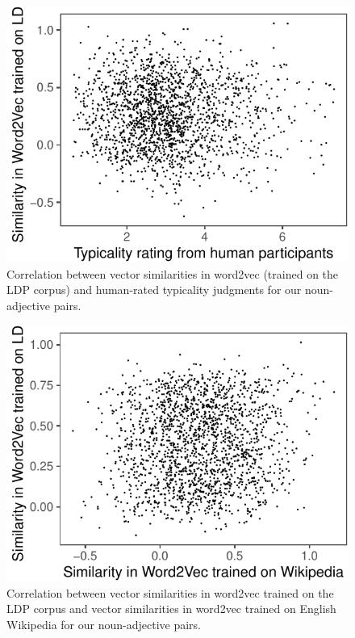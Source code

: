 \documentclass[10pt, letterpaper]{article}
\newenvironment{CodeChunk}{}{}
\begin{document}
\begin{CodeChunk}
\begin{figure}[tb]

{\centering \includegraphics{figs/word2vec1-1} 

}

\caption[Correlation between vector similarities in word2vec (trained on the LDP corpus) and human-rated typicality judgments for our noun-adjective pairs]{Correlation between vector similarities in word2vec (trained on the LDP corpus) and human-rated typicality judgments for our noun-adjective pairs.}\label{fig:word2vec1}
\end{figure}
\end{CodeChunk}
\begin{CodeChunk}
\begin{figure}[tb]

{\centering \includegraphics{figs/word2vec2-1} 

}

\caption[Correlation between vector similarities in word2vec trained on the LDP corpus and vector similarities in word2vec trained on English Wikipedia for our noun-adjective pairs]{Correlation between vector similarities in word2vec trained on the LDP corpus and vector similarities in word2vec trained on English Wikipedia for our noun-adjective pairs.}\label{fig:word2vec2}
\end{figure}
\end{CodeChunk}
\end{document}
